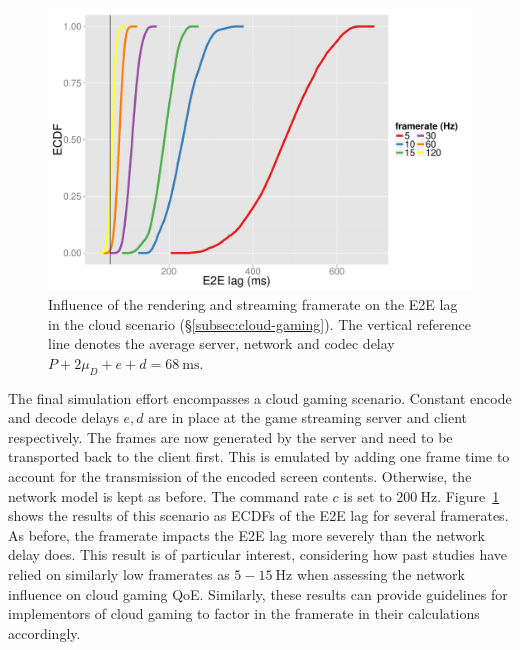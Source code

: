 \begin{figure}[!t]
	\centering
	\includegraphics[width=1.0\columnwidth]{../../../simulation/visualization/cloudgaming-lag-cdf.pdf}
	\caption{Influence of the rendering and streaming framerate on the \gls{E2E} lag in the cloud scenario (§\ref{subsec:cloud-gaming}). The vertical reference line denotes the average server, network and codec delay $P+2\mu_D+e+d=\SI{68}{\milli\second}$.}
\label{fig:cloud-e2e-delay-sim}
\end{figure}

The final simulation effort encompasses a cloud gaming scenario. Constant encode  and decode delays $e,d$ are in place at the game streaming server and client respectively. The frames are now generated by the server and need to be transported back to the client first. This is emulated by adding one frame time to account for the transmission of the encoded screen contents. Otherwise, the network model is kept as before. The command rate $c$ is set to $\SI{200}{\hertz}$. Figure~\ref{fig:cloud-e2e-delay-sim} shows the results of this scenario as \acrshort{ECDF}s of the \gls{E2E} lag for several framerates. As before, the framerate impacts the \gls{E2E} lag more severely than the network delay does. This result is of particular interest, considering how past studies have relied on similarly low framerates as $5-\SI{15}{\hertz}$ when assessing the network influence on cloud gaming \gls{QoE}. Similarly, these results can provide guidelines for implementors of cloud gaming to factor in the framerate in their calculations accordingly.


